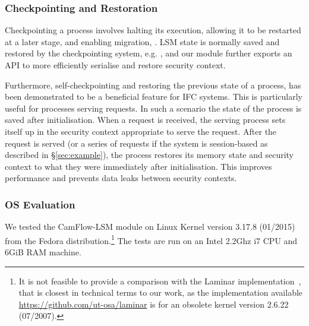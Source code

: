 \documentclass[10pt,journal,compsoc]{IEEEtran}
\begin{document}
\subsubsection{Checkpointing and Restoration}
\label{sec:os:checkpoint}

Checkpointing a process involves halting its execution, allowing it to be restarted at a later stage, and enabling migration, \eg \cite{egwutuoha2013survey}.
LSM state is normally saved and restored by the checkpointing system, e.g. \cite{laadan2010linux}, and our module further exports an API to more efficiently serialise and restore security context.


Furthermore, self-checkpointing and restoring the previous state of a process, has been demonstrated \cite{niu2013efficient} to be a beneficial feature for IFC systems. 
This is particularly useful for processes serving requests.
In such a scenario the state of the process is saved after initialisation. 
When a request is received, the serving process sets itself up in the security context appropriate to serve the request.
After the request is served (or a series of requests if the system is session-based as described in \S\ref{sec:example}), the process restores its memory state and security context to what they were immediately after initialisation. This improves performance and prevents data leaks between security contexts.


\subsubsection{OS Evaluation}
\label{sec:os:evaluation}

We tested the CamFlow-LSM module on Linux Kernel version 3.17.8 (01/2015) from the Fedora distribution.\footnote{It is not feasible to provide a comparison with the Laminar implementation~\cite{porter2014practical}, that is closest in technical terms to our work, as the implementation available \url{https://github.com/ut-osa/laminar} is for an obsolete kernel version 2.6.22 (07/2007).}
The tests are run on an Intel 2.2Ghz i7 CPU and 6GiB RAM machine.
\end{document}
